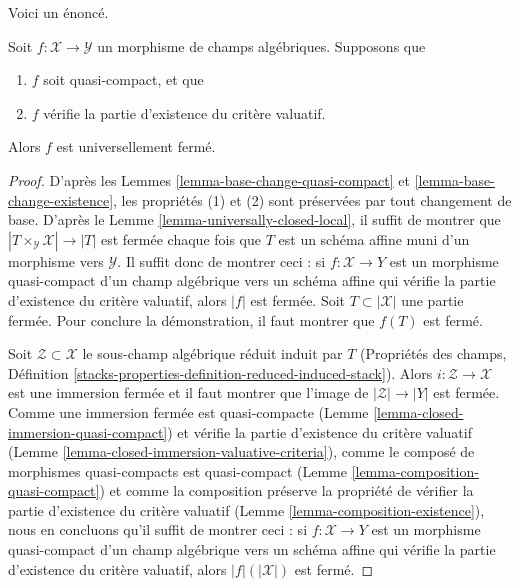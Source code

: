 \noindent
Voici un énoncé.

\begin{lemma}
\label{lemma-quasi-compact-existence-universally-closed}
Soit $f : \mathcal{X} \to \mathcal{Y}$ un morphisme de champs algébriques.
Supposons que
\begin{enumerate}
\item $f$ soit quasi-compact, et que
\item $f$ vérifie la partie d'existence du critère valuatif.
\end{enumerate}
Alors $f$ est universellement fermé.
\end{lemma}

\begin{proof}
D'après les Lemmes \ref{lemma-base-change-quasi-compact}
et \ref{lemma-base-change-existence},
les propriétés (1) et (2) sont préservées par
tout changement de base. D'après le Lemme \ref{lemma-universally-closed-local},
il suffit de montrer que $|T \times_\mathcal{Y} \mathcal{X}| \to |T|$
est fermée chaque fois que $T$ est un schéma affine muni d'un morphisme vers $\mathcal{Y}$.
Il suffit donc de montrer ceci : si $f : \mathcal{X} \to Y$ est un
morphisme quasi-compact d'un champ algébrique vers un schéma affine
qui vérifie la partie d'existence du critère valuatif,
alors $|f|$ est fermée. Soit $T \subset |\mathcal{X}|$ une partie fermée.
Pour conclure la démonstration, il faut montrer que $f(T)$ est fermé.

\medskip\noindent
Soit $\mathcal{Z} \subset \mathcal{X}$ le sous-champ algébrique réduit
induit par $T$ (Propriétés des champs,
Définition \ref{stacks-properties-definition-reduced-induced-stack}).
Alors $i : \mathcal{Z} \to \mathcal{X}$ est une immersion fermée
et il faut montrer que l'image de $|\mathcal{Z}| \to |Y|$
est fermée. Comme une immersion fermée est quasi-compacte
(Lemme \ref{lemma-closed-immersion-quasi-compact})
et vérifie la partie d'existence du critère valuatif
(Lemme \ref{lemma-closed-immersion-valuative-criteria}),
comme le composé de morphismes quasi-compacts est quasi-compact
(Lemme \ref{lemma-composition-quasi-compact})
et comme la composition préserve la propriété de vérifier
la partie d'existence du critère valuatif
(Lemme \ref{lemma-composition-existence}),
nous en concluons qu'il suffit de montrer ceci : si $f : \mathcal{X} \to Y$
est un morphisme quasi-compact d'un champ algébrique vers un schéma affine
qui vérifie la partie d'existence du critère valuatif,
alors $|f|(|\mathcal{X}|)$ est fermé.


\end{proof}
